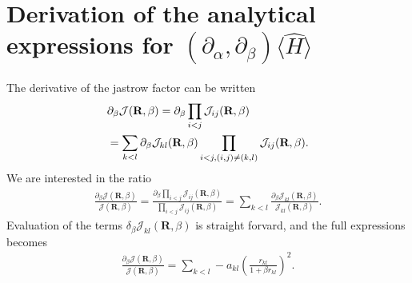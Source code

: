 \documentclass[a4paper,10pt,twocolumn]{article} %
\newcommand{\ts}[1]{\textbf{#1}}
\newcommand{\expec}[1]{\langle{}{#1}\rangle{}}
\begin{document}
\begin{appendix}
\begin{algorithmic}
		\ENDIF{}
	\ENDLOOP{}
\end{algorithmic}

\section{Derivation of the analytical expressions for $(\partial_\alpha,\partial_\beta)\expec{\hat H}$}%

The derivative of the jastrow factor can be written
\begin{align}
	&\partial_\beta \mathcal J(\ts R,\beta) =\partial_\beta \prod_{i<j} \mathcal J_{ij}(\ts R,\beta)\notag\\ 
	&= \sum_{k<l}\partial_\beta \mathcal J_{kl}(\ts R,\beta) 
		\prod_{
			i<j,
			(i,j)\neq(k,l) 
		}
	\mathcal J_{ij}(\ts R,\beta).
\end{align}
We are interested in the ratio
\begin{align}
	\frac{\partial_\beta\mathcal J(\ts R,\beta)}{\mathcal J(\ts R,\beta)}
	=\frac{\partial_\beta \prod_{i<j} \mathcal J_{ij}(\ts R,\beta) }
	{\prod_{i<j} \mathcal J_{ij}(\ts R,\beta)}
	= \sum_{k<l}\frac{\partial_\beta \mathcal J_{kl}(\ts R,\beta)}{\mathcal J_{kl}(\ts R,\beta)}.
\end{align}
Evaluation of the terms $\delta_\beta \mathcal J_{kl}(\ts R,\beta)$ is straight forvard, and the full expressions becomes
\begin{align}
	\frac{\partial_\beta\mathcal J(\ts R,\beta)}{\mathcal J(\ts R,\beta)}
	=	
	\sum_{k<l}-a_{kl}
	\left( 
		\frac {r_{kl}} {1+\beta r_{kl}}
	\right)^2.
\end{align}


\end{appendix}
\end{document}
